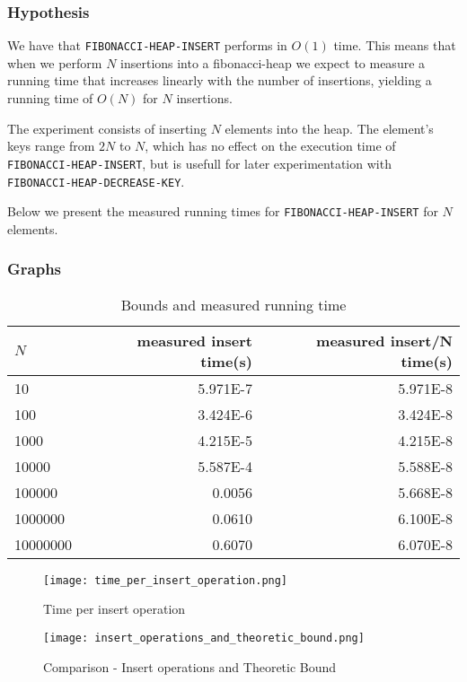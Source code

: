 \documentclass[a4paper,oneside,11pt]{article}
\begin{document}
\begin{itemize}
\subsubsection*{Hypothesis}
We have that \texttt{FIBONACCI-HEAP-INSERT} performs in $O(1)$ time. This means that when we perform $N$ insertions into a fibonacci-heap we expect to measure a running time that increases linearly with the number of insertions, yielding a running time of $O(N)$ for $N$ insertions.

The experiment consists of inserting $N$ elements into the heap. The element's keys range from $2N$ to $N$, which has no effect on the execution time of \texttt{FIBONACCI\--HEAP\--INSERT}, but is usefull for later experimentation with \texttt{FIBONACCI\--HEAP\--DECREASE\--KEY}.

Below we present the measured running times for \texttt{FIBONACCI\--HEAP\--INSERT} for $N$ elements.
\subsubsection*{Graphs}
\begin{table}
  \begin{center}
    \begin{tabular}{l|r|r}
      $N$ & measured insert time(s) & measured insert/N time(s)\\
      \hline
      10       & \num{5.971E-7}     & \num{5.971E-8}\\
      100      & \num{3.424E-6}     & \num{3.424E-8}\\
      1000     & \num{4.215E-5}     & \num{4.215E-8}\\
      10000    & \num{5.587E-4}     & \num{5.588E-8}\\
      100000   & \num{0.0056}       & \num{5.668E-8}\\
      1000000  & \num{0.0610}       & \num{6.100E-8}\\
      10000000 & \num{0.6070}       & \num{6.070E-8}
    \end{tabular}
    \caption{Bounds and measured running time}
  \end{center}
\end{table}
\begin{figure}
  \texttt{[image: time\_per\_insert\_operation.png]}
  \caption{Time per insert operation}
\end{figure}
\begin{figure}
  \texttt{[image: insert\_operations\_and\_theoretic\_bound.png]}
  \caption{Comparison - Insert operations and Theoretic Bound}
\end{figure}


\end{itemize}
\end{document}

